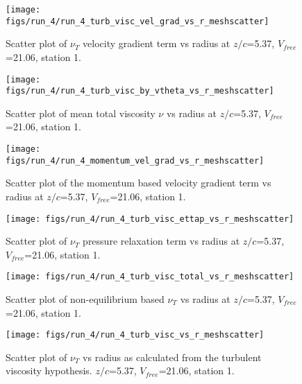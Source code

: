 \begin{figure}[H]
\centering
\texttt{[image: figs/run\_4/run\_4\_turb\_visc\_vel\_grad\_vs\_r\_meshscatter]}
\caption{Scatter plot of $\nu_T$ velocity gradient term vs radius at $z/c$=5.37, $V_{free}$=21.06, station 1.}
\end{figure}


\begin{figure}[H]
\centering
\texttt{[image: figs/run\_4/run\_4\_turb\_visc\_by\_vtheta\_vs\_r\_meshscatter]}
\caption{Scatter plot of mean total viscosity $\nu$ vs radius at $z/c$=5.37, $V_{free}$=21.06, station 1.}
\end{figure}


\begin{figure}[H]
\centering
\texttt{[image: figs/run\_4/run\_4\_momentum\_vel\_grad\_vs\_r\_meshscatter]}
\caption{Scatter plot of the momentum based velocity gradient term vs radius at $z/c$=5.37, $V_{free}$=21.06, station 1.}
\end{figure}


\begin{figure}[H]
\centering
\texttt{[image: figs/run\_4/run\_4\_turb\_visc\_ettap\_vs\_r\_meshscatter]}
\caption{Scatter plot of $\nu_T$ pressure relaxation term vs radius at $z/c$=5.37, $V_{free}$=21.06, station 1.}
\end{figure}


\begin{figure}[H]
\centering
\texttt{[image: figs/run\_4/run\_4\_turb\_visc\_total\_vs\_r\_meshscatter]}
\caption{Scatter plot of non-equilibrium based $\nu_T$ vs radius at $z/c$=5.37, $V_{free}$=21.06, station 1.}
\end{figure}


\begin{figure}[H]
\centering
\texttt{[image: figs/run\_4/run\_4\_turb\_visc\_vs\_r\_meshscatter]}
\caption{Scatter plot of $\nu_T$ vs radius as calculated from the turbulent viscosity hypothesis. $z/c$=5.37, $V_{free}$=21.06, station 1.}
\end{figure}


